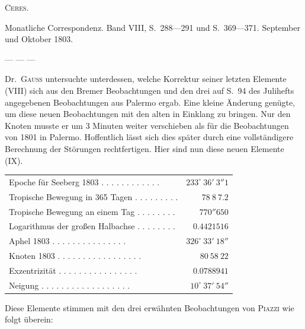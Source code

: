 \centerline{\textsc{Ceres.}}

\medskip
Monatliche Correspondenz. Band VIII, S.\ 288—291 und S.\ 369—371. September und Oktober 1803.

\medskip
— — —

\medskip
Dr.\ \textsc{Gauß} untersuchte unterdessen, welche Korrektur seiner letzten Elemente (VIII) sich aus den Bremer Beobachtungen und den drei auf S.\ 94 des Julihefts angegebenen Beobachtungen aus Palermo ergab. Eine kleine Änderung genügte, um diese neuen Beobachtungen mit den alten in Einklang zu bringen. Nur den Knoten musste er um 3 Minuten weiter verschieben als für die Beobachtungen von 1801 in Palermo. Hoffentlich lässt sich dies später durch eine vollständigere Berechnung der Störungen rechtfertigen. Hier sind nun diese neuen Elemente (IX).

\begin{center}
\begingroup\fontsize{9}{11}\selectfont\setlength{\tabcolsep}{3pt}
\begin{tabular}{lr}
Epoche für Seeberg 1803 . . . . . . . . . . . . & $233^\circ\ 36'\ 3''1$ \\
Tropische Bewegung in 365 Tagen . . . . . . . . . & $78\ 8\ 7.2$ \\
Tropische Bewegung an einem Tag . . . . . . . . & $770''650$ \\
Logarithmus der großen Halbachse . . . . . . . . & $0.4421516$ \\
Aphel 1803 . . . . . . . . . . . . . . . & $326^\circ\ 33'\ 18''$ \\
Knoten 1803 . . . . . . . . . . . . . . . . . & $80\ 58\ 22$ \\
Exzentrizität . . . . . . . . . . . . . . . . & $0.0788941$ \\
Neigung . . . . . . . . . . . . . . . . . . & $10^\circ\ 37'\ 54''$ \\
\end{tabular}\endgroup
\end{center}
%

Diese Elemente stimmen mit den drei erwähnten Beobachtungen von \textsc{Piazzi} wie folgt überein:

